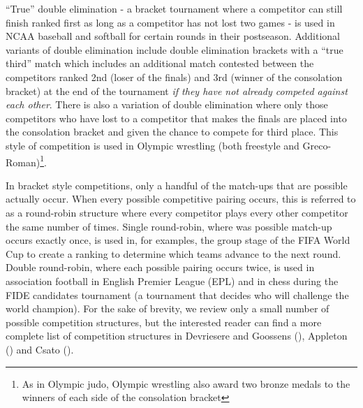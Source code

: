 \documentclass[
  12pt,
]{article}
\begin{document}
``True'' double elimination - a bracket tournament where a competitor
can still finish ranked first as long as a competitor has not lost two
games - is used in NCAA baseball and softball for certain rounds in
their postseason. Additional variants of double elimination include
double elimination brackets with a ``true third'' match which includes
an additional match contested between the competitors ranked 2nd (loser
of the finals) and 3rd (winner of the consolation bracket) at the end of
the tournament \emph{if they have not already competed against each
other}. There is also a variation of double elimination where only those
competitors who have lost to a competitor that makes the finals are
placed into the consolation bracket and given the chance to compete for
third place. This style of competition is used in Olympic wrestling
(both freestyle and Greco-Roman)\footnote{As in Olympic judo, Olympic
  wrestling also award two bronze medals to the winners of each side of
  the consolation bracket}.

In bracket style competitions, only a handful of the match-ups that are
possible actually occur. When every possible competitive pairing occurs,
this is referred to as a round-robin structure where every competitor
plays every other competitor the same number of times. Single
round-robin, where was possible match-up occurs exactly once, is used
in, for examples, the group stage of the FIFA World Cup to create a
ranking to determine which teams advance to the next round. Double
round-robin, where each possible pairing occurs twice, is used in
association football in English Premier League (EPL) and in chess during
the FIDE candidates tournament (a tournament that decides who will
challenge the world champion). For the sake of brevity, we review only a
small number of possible competition structures, but the interested
reader can find a more complete list of competition structures in
Devriesere and Goossens (), Appleton
() and Csato
().
\end{document}
